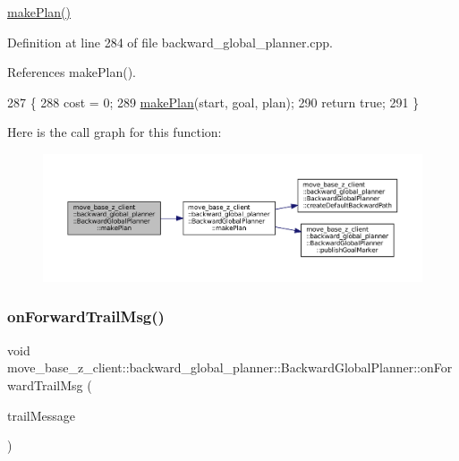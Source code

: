 \hyperlink{classmove__base__z__client_1_1backward__global__planner_1_1BackwardGlobalPlanner_af9441c1bd8d258281458ca7fa012e0e6}{make\+Plan()} 

Definition at line 284 of file backward\+\_\+global\+\_\+planner.\+cpp.



References make\+Plan().


\begin{DoxyCode}
287 \{
288     cost = 0;
289     \hyperlink{classmove__base__z__client_1_1backward__global__planner_1_1BackwardGlobalPlanner_af9441c1bd8d258281458ca7fa012e0e6}{makePlan}(start, goal, plan);
290     \textcolor{keywordflow}{return} \textcolor{keyword}{true};
291 \}
\end{DoxyCode}
Here is the call graph for this function\+:
\nopagebreak
\begin{figure}[H]
\begin{center}
\leavevmode
\includegraphics[width=350pt]{classmove__base__z__client_1_1backward__global__planner_1_1BackwardGlobalPlanner_a8fa9df4146c5ee1d4b597e49466016e0_cgraph}
\end{center}
\end{figure}
\mbox{\label{classmove__base__z__client_1_1backward__global__planner_1_1BackwardGlobalPlanner_a21ba5e6dbe063eb3ea1a34d8cccf90a3}} 
\subsubsection{\texorpdfstring{on\+Forward\+Trail\+Msg()}{onForwardTrailMsg()}}
{\footnotesize\ttfamily void move\+\_\+base\+\_\+z\+\_\+client\+::backward\+\_\+global\+\_\+planner\+::\+Backward\+Global\+Planner\+::on\+Forward\+Trail\+Msg (\begin{DoxyParamCaption}\item[{const nav\+\_\+msgs\+::\+Path\+::\+Const\+Ptr \&}]{trail\+Message }\end{DoxyParamCaption})\hspace{0.3cm}{\ttfamily [private]}}

